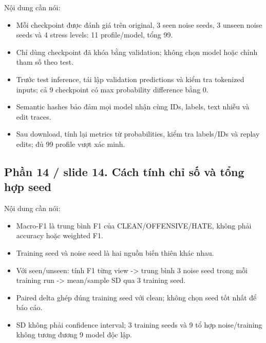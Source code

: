 \documentclass[11pt,a4paper]{article}
\begin{document}
Nội dung cần nói:


\begin{itemize}

\item Mỗi checkpoint được đánh giá trên original, 3 seen noise seeds, 3 unseen noise seeds và 4 stress levels: 11 profile/model, tổng 99.

\item Chỉ dùng checkpoint đã khóa bằng validation; không chọn model hoặc chỉnh tham số theo test.

\item Trước test inference, tái lập validation predictions và kiểm tra tokenized inputs; cả 9 checkpoint có max probability difference bằng 0.

\item Semantic hashes bảo đảm mọi model nhận cùng IDs, labels, text nhiễu và edit traces.

\item Sau download, tính lại metrics từ probabilities, kiểm tra labels/IDs và replay edits; đủ 99 profile vượt xác minh.

\end{itemize}

\subsection*{Phần 14 / slide 14. Cách tính chỉ số và tổng hợp seed}

Nội dung cần nói:


\begin{itemize}

\item Macro-F1 là trung bình F1 của CLEAN/OFFENSIVE/HATE, không phải accuracy hoặc weighted F1.

\item Training seed và noise seed là hai nguồn biến thiên khác nhau.

\item Với seen/unseen: tính F1 từng view -> trung bình 3 noise seed trong mỗi training run -> mean/sample SD qua 3 training seed.

\item Paired delta ghép đúng training seed với clean; không chọn seed tốt nhất để báo cáo.

\item SD không phải confidence interval; 3 training seeds và 9 tổ hợp noise/training không tương đương 9 model độc lập.

\end{itemize}
\end{document}

